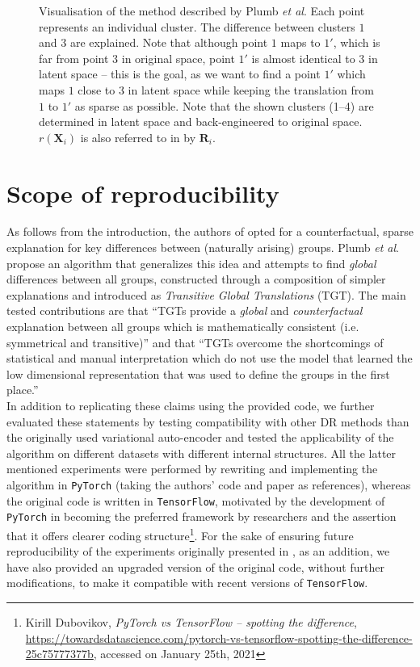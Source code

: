 \begin{figure}[h]
  \scalebox{0.737}{}
  \caption{Visualisation of the method described by Plumb \textit{et al}. Each point represents an individual cluster. The difference between clusters $1$ and $3$ are explained. Note that although point $1$ maps to $1'$, which is far from point $3$ in original space, point $1'$ is almost identical to $3$ in latent space -- this is the goal, as we want to find a point $1'$ which maps $1$ close to $3$ in latent space while keeping the translation from $1$ to $1'$ as sparse as possible. Note that the shown clusters (1--4) are determined in latent space and back-engineered to original space. $r(\boldsymbol{X}_i)$ is also referred to in \cite{plumb2020explaining} by $\boldsymbol{R}_i$.}
\end{figure}

\section{Scope of reproducibility}
As follows from the introduction, the authors of \cite{plumb2020explaining} opted for a counterfactual, sparse explanation for key differences between (naturally arising) groups. Plumb \textit{et al}. propose an algorithm that generalizes this idea and attempts to find \textit{global} differences between all groups, constructed through a composition of simpler explanations and introduced as \textit{Transitive Global Translations} (TGT). The main tested contributions are that ``TGTs provide a \textit{global} and \textit{counterfactual} explanation between all groups which is mathematically consistent (i.e. symmetrical and transitive)'' and that ``TGTs overcome the shortcomings of statistical and manual interpretation which do not use the model that learned the low dimensional representation that was used to define the groups in the first place.''\\

In addition to replicating these claims using the provided code, we further evaluated these statements by testing compatibility with other DR methods than the originally used variational auto-encoder and tested the applicability of the algorithm on different datasets with different internal structures. All the latter mentioned experiments were performed by rewriting and implementing the algorithm in \texttt{PyTorch} (taking the authors' code and paper as references), whereas the original code is written in \texttt{TensorFlow}, motivated by the development of \texttt{PyTorch} in becoming the preferred framework by researchers \cite{he2019mlframeworks} and the assertion that it offers clearer coding structure\footnote{Kirill Dubovikov, \textit{PyTorch vs TensorFlow -- spotting the difference}, \url{https://towardsdatascience.com/pytorch-vs-tensorflow-spotting-the-difference-25c75777377b}, accessed on January 25th, 2021}. For the sake of ensuring future reproducibility of the experiments originally presented in \cite{plumb2020explaining}, as an addition, we have also provided an upgraded version of the original code, without further modifications, to make it compatible with recent versions of \texttt{TensorFlow}.

